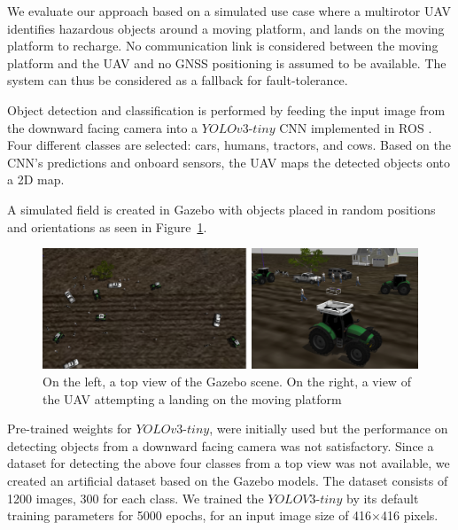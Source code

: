 \documentclass[conference]{IEEEtran}
\begin{document}
We evaluate our approach based on a simulated use case where %
a multirotor UAV identifies
hazardous objects around a moving platform, and lands on the
moving platform to recharge.
%
%
No communication link is considered between the moving platform and the UAV
and no GNSS positioning is assumed to be available. The system can thus be
considered as a fallback for fault-tolerance.


Object detection and classification is performed by feeding the input
image from the downward facing camera into a $YOLOv3$-$tiny$ CNN
\cite{yolov3} implemented in ROS \cite{bjelonicYolo2018}. Four
different classes are selected: cars, humans, tractors, and
cows. Based on the CNN's predictions and onboard
sensors, the UAV maps the detected objects onto a 2D map.
 

A simulated field is created in Gazebo with objects placed in random
positions and orientations as seen in Figure~\ref{fig:Gazebo}.

\begin{figure}[h]
\centering
\includegraphics[scale=0.2]{gazebo_scalled.png}
\caption{On the left, a top view of the Gazebo scene. On the right, a view of the UAV attempting a landing on the moving platform }
\label{fig:Gazebo}
\end{figure}

Pre-trained weights for $YOLOv3$-$tiny$, were initially used but the
performance on detecting objects from a downward facing camera was
not satisfactory. Since a dataset for detecting the above four classes
from a top view was not available, we created an artificial dataset
based on the Gazebo models. The dataset consists of 1200 images, 300
for each class. We trained the $YOLOV3$-$tiny$ by its default training
parameters for 5000 epochs, for an input image size of 416$\times$416
pixels.
\end{document}
